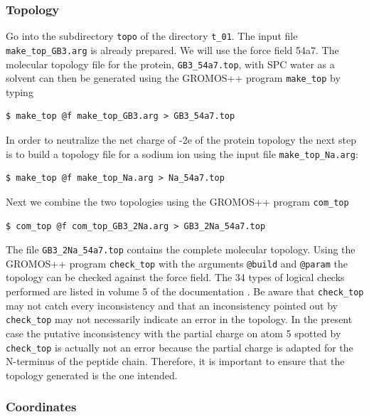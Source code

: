 \subsubsection{Topology}
Go into the subdirectory \texttt{topo} of the directory \texttt{t\_01}. The input file \texttt{make\_top\_GB3.arg} is already prepared. We will use the force field 54a7. 
The molecular topology file for the protein, \texttt{GB3\_54a7.top}, with SPC water as a solvent can then be generated using the GROMOS++ program \texttt{make\_top} 
by typing
\begin{lstlisting}
$ make_top @f make_top_GB3.arg > GB3_54a7.top
\end{lstlisting}
In order to neutralize the net charge of -2e of the protein topology the next step is to build a topology file for a sodium ion using the input file \texttt{make\_top\_Na.arg}:
\begin{lstlisting}
$ make_top @f make_top_Na.arg > Na_54a7.top
\end{lstlisting}
Next we combine the two topologies using the GROMOS++ program \texttt{com\_top}
\begin{lstlisting}
$ com_top @f com_top_GB3_2Na.arg > GB3_2Na_54a7.top
\end{lstlisting}
The file \texttt{GB3\_2Na\_54a7.top} contains the complete molecular topology. Using the GROMOS++ program \texttt{check\_top} with the arguments \texttt{@build} and \texttt{@param} the topology can be checked against the force field. 
The 34 types of logical checks performed are listed in volume 5 of the documentation \cite{volume_5}.
Be aware that \texttt{check\_top} may not catch every inconsistency 
and that an inconsistency pointed out by \texttt{check\_top} may not necessarily indicate an error in the topology.
In the present case the putative inconsistency with the partial charge on atom 5 spotted by \texttt{check\_top} is 
actually not an error because the partial charge is adapted for the N-terminus of the peptide chain.
Therefore, it is important to ensure that the topology generated is the one intended.

\subsubsection{Coordinates}

